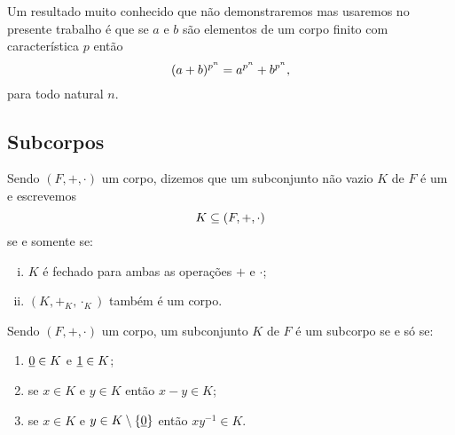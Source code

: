 \begin{Obs}\label{obsabpnapnbpn}
  Um resultado muito conhecido que não demonstraremos mas usaremos no
  presente trabalho é que se $a$ e $b$ são elementos de um corpo finito
  com característica $p$ então
  \begin{equation*}
    (a+b)^{p^n} = a^{p^n} + b^{p^n}\mathrm{,}
  \end{equation*}
  para todo natural $n$.
\end{Obs}

\subsection{Subcorpos}

\begin{Def}
  Sendo $(F,+,\cdot)$ um corpo, dizemos que um subconjunto não vazio
  $K$ de $F$ é
  um  e escrevemos
  \begin{equation*}
    \simb[propriedade de subcorpo de $K$ em relação a
    $(F,+,\cdot)$]{K\subseteq (F,+,\cdot)}
  \end{equation*}
  se e somente se:
  \begin{enumerate}[(i)]
    \item $K$ é fechado para ambas as operações $+$ e $\cdot$;
    \item $(K,+_K,\cdot_K)$ também é um corpo.
  \end{enumerate}
\end{Def}

\begin{Teo}\label{teosubcorpo}
  Sendo $(F,+,\cdot)$ um corpo, um subconjunto $K$ de $F$ é um subcorpo
  se e só se:
  \begin{enumerate}
    \item $\underline{0}\in K$ e $\underline{1}\in K$;
    \item se $x\in K$ e $y\in K$ então $x-y\in K$;
    \item se $x\in K$ e $y\in K\setminus\left\{ \underline{0} \right\}$ então $xy^{-1}\in
      K$.
  \end{enumerate}
\end{Teo}

